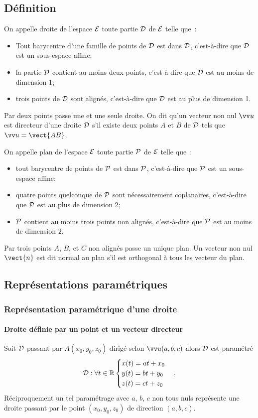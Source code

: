 \subsection{Définition}
\begin{defdef}
  On appelle droite de l'espace $\E$ toute partie $\Dr$ de $\E$ telle que~:
  \begin{itemize}
  \item Tout barycentre d'une famille de points de $\Dr$ est dans $\Dr$, c'est-à-dire que $\Dr$ est un sous-espace affine;
  \item la partie $\Dr$ contient au moins deux points, c'est-à-dire que $\Dr$ est au moins de dimension 1;
  \item trois points de $\Dr$ sont alignés, c'est-à-dire que $\Dr$ est au plus de dimension 1.
  \end{itemize}
Par deux points passe une et une seule droite. On dit qu'un vecteur non nul $\vu$ est directeur d'une droite $\Dr$ s'il existe deux points $A$ et $B$ de $\Dr$ tels que $\vu=\vect{AB}$.
\end{defdef}
\begin{defdef}
  On appelle plan de l'espace $\E$ toute partie $\P$ de $\E$ telle que~:
  \begin{itemize}
  \item tout barycentre de points de $\P$ est dans $\P$, c'est-à-dire que $\P$ est un sous-espace affine;
  \item quatre points quelconque de $\P$ sont nécessairement coplanaires, c'est-à-dire que $\P$ est au plus de dimension $2$;
  \item $\P$ contient au moins trois points non alignés, c'est-à-dire que $\P$ est au moins de dimension $2$.
  \end{itemize}
Par trois points $A$, $B$, et $C$ non alignés passe un unique plan. Un vecteur non nul $\vect{n}$ est dit normal au plan s'il est orthogonal à tous les vecteur du plan.
\end{defdef}

\subsection{Représentations paramétriques}
\subsubsection{Représentation paramétrique d'une droite}
\paragraph{Droite définie par un point et un vecteur directeur}
Soit $\Dr$ passant par $A(x_0,y_0,z_0)$ dirigé selon $\vu(a,b,c)$ alors $\Dr$ est paramétré 
\begin{equation}
  \Dr : \forall t\in\R
  \begin{cases}
    x(t)=at+x_0\\y(t)=bt+y_0\\z(t)=ct+z_0
  \end{cases}.
\end{equation}
Réciproquement un tel paramétrage avec $a$, $b$, $c$ non tous nuls représente une droite passant par le point $(x_0,y_0,z_0)$ de direction $(a,b,c)$.


